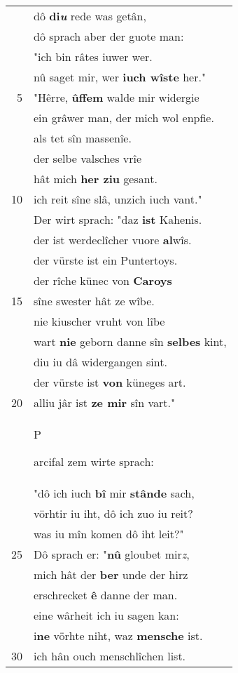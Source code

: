 \documentclass[8pt,a4paper,notitlepage]{article}
\begin{document}
\begin{table}[ht]
\begin{minipage}[t]{0.5\linewidth}
\begin{tabular}{rl}
 & dô \textbf{di\textit{u}} rede was getân,\\ 
 & dô sprach aber der guote man:\\ 
 & "ich bin râtes iuwer wer.\\ 
 & nû saget mir, wer \textbf{iuch wîste} her."\\ 
5 & "Hêrre, \textbf{ûffem} walde mir widergie\\ 
 & ein grâwer man, der mich wol enpfie.\\ 
 & als tet sîn massenîe.\\ 
 & der selbe valsches vrîe\\ 
 & hât mich \textbf{her ziu} gesant.\\ 
10 & ich reit sîne slâ, unzich iuch vant."\\ 
 & Der wirt sprach: "daz \textbf{ist} Kahenis.\\ 
 & der ist werdeclîcher vuore \textbf{al}wîs.\\ 
 & der vürste ist ein Puntertoys.\\ 
 & der rîche künec von \textbf{Caroys}\\ 
15 & sîne swester hât ze wîbe.\\ 
 & nie kiuscher vruht von lîbe\\ 
 & wart \textbf{nie} geborn danne sîn \textbf{selbes} kint,\\ 
 & diu iu dâ widergangen sint.\\ 
 & der vürste ist \textbf{von} küneges art.\\ 
20 & alliu jâr ist \textbf{ze mir} sîn vart."\\ 
 & \begin{large}P\end{large}arcifal zem wirte sprach:\\ 
 & "dô ich iuch \textbf{bî} mir \textbf{stânde} sach,\\ 
 & vörhtir iu iht, dô ich zuo iu reit?\\ 
 & was iu mîn komen dô iht leit?"\\ 
25 & Dô sprach er: "\textbf{nû} gloubet mir\textit{z},\\ 
 & mich hât der \textbf{ber} unde der hirz\\ 
 & erschrecket \textbf{ê} danne der man.\\ 
 & eine wârheit ich iu sagen kan:\\ 
 & i\textbf{ne} vörhte niht, waz \textbf{mensche} ist.\\ 
30 & ich hân ouch menschlîchen list.\\ 

\end{tabular}
\end{minipage}
\end{table}
\end{document}
